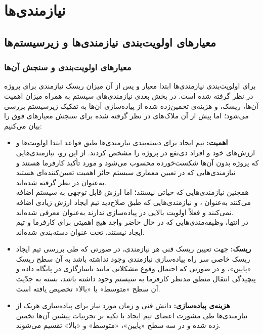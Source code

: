 \chapter{نیازمندی‌ها}

\section{معیارهای اولویت‌بندی نیازمندی‌ها و زیرسیستم‌ها}

\subsection{معیارهای اولویت‌بندی و سنجش آن‌ها}

 برای اولویت‌بندی نیازمندی‌ها ابتدا معیار 
و پس از آن میزان ریسک نیازمندی برای پروژه در نظر گرفته شده است. 
در بخش بعدی نیازمندی‌های سیستم به همراه میزان اهمیت آن‌ها، ریسک، و هزینه‌ی تخمین‌زده شده از پیاده‌سازی آن‌ها به تفکیک زیرسیستم بررسی می‌شود؛ اما پیش از آن ملاک‌های در نظر گرفته شده برای سنجش معیارهای فوق را بیان می‌کنیم:

\begin{itemize}
	\item \textbf{اهمیت:}
	تیم ایجاد برای دسته‌بندی نیازمندی‌ها طبق قواعد
	ابتدا اولویت‌ها و ارزش‌های خود و افراد ذی‌نفع‌ در پروژه را مشخص کردند. از این رو، نیازمندی‌هایی که پروژه بدون آن‌ها شکست‌خورده محسوب می‌شود و مورد تأکید کارفرما هستند و نیازمندی‌هایی که در تعیین معماری سیستم حائز اهمیت تعیین‌کننده‌ای هستند به‌عنوان
	در نظر گرفته شده‌اند. \\
	همچنین نیازمندی‌هایی که حیاتی نیستند؛ اما ارزش قابل توجهی به سیستم اضافه می‌کنند به‌عنوان
		،
	و نیازمندی‌هایی که طبق صلاح‌دید تیم ایجاد ارزش زیادی اضافه نمی‌کنند و فعلاً اولویت بالایی در پیاده‌سازی ندارند به‌عنوان
	معرفی شده‌اند. \\
	در انتها، وظیفه‌مندی‌هایی که در حال حاضر واجد هیچ اهمیتی برای کارفرما و تیم ایجاد نیستند، تحت عنوان
	دسته‌بندی شده‌اند.
	\item \textbf{ریسک:}
	جهت تعیین ریسک فنی هر نیازمندی، در صورتی که طی بررسی تیم ایجاد ریسک خاصی سر راه پیاده‌سازی نیازمندی وجود نداشته باشد به آن سطح ریسک «پایین»، و در صورتی که احتمال وقوع مشکلاتی مانند ناسازگاری در پایگاه داده و پیچیدگی انتقال منطق مدنظر کارفرما به سیستم وجود داشته باشد، بسته به جدّیت آن سطح «متوسط» یا «بالا» تخصیص یافته است.
	\item \textbf{هزینه‌ی پیاده‌سازی:}
	دانش فنی و زمان مورد نیاز برای پیاده‌سازی هریک از نیازمندی‌ها طی مشورت اعضای تیم ایجاد با تکیه بر تجربیات پیشین آن‌ها تخمین زده شده و در سه سطح «پایین»، «متوسط» و «بالا» تقسیم می‌شوند.
\end{itemize}


